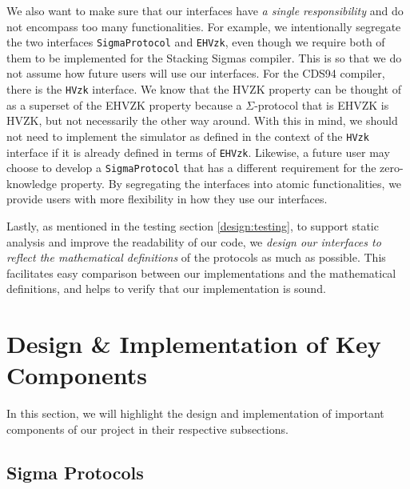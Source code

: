We also want to make sure that our interfaces have \textit{a single responsibility} and do not 
encompass too many functionalities. For example, we intentionally segregate the two interfaces 
\texttt{SigmaProtocol} and \texttt{EHVzk}, even though we require both of them to be implemented 
for the Stacking Sigmas compiler. This is so that we do not assume how future users will use 
our interfaces. For the CDS94 compiler, there is the \texttt{HVzk} interface. We know that the 
HVZK property can be thought of as a superset of the EHVZK property because a $\Sigma$-protocol that is 
EHVZK is HVZK, but not necessarily the other way around. With this in mind, we
should not need to implement the simulator as defined in the context of the \texttt{HVzk} interface if 
it is already defined in terms of \texttt{EHVzk}. 
Likewise, a future user may choose to develop a 
\texttt{SigmaProtocol} that has a different requirement for the zero-knowledge property. By 
segregating the interfaces into atomic functionalities, we provide users with more flexibility 
in how they use our interfaces.

Lastly, as mentioned in the testing section \ref{design:testing}, to support static analysis and 
improve the readability of our code, we \textit{design our interfaces to reflect the 
mathematical definitions} of the protocols as much as possible. This facilitates easy 
comparison between our implementations and the mathematical definitions, and helps to 
verify that our implementation is sound. 

% 


\section{Design \& Implementation of Key Components}
In this section, we will highlight the design and implementation 
of important components of our project in their respective subsections.

\subsection{Sigma Protocols}\label{design:sigma}


